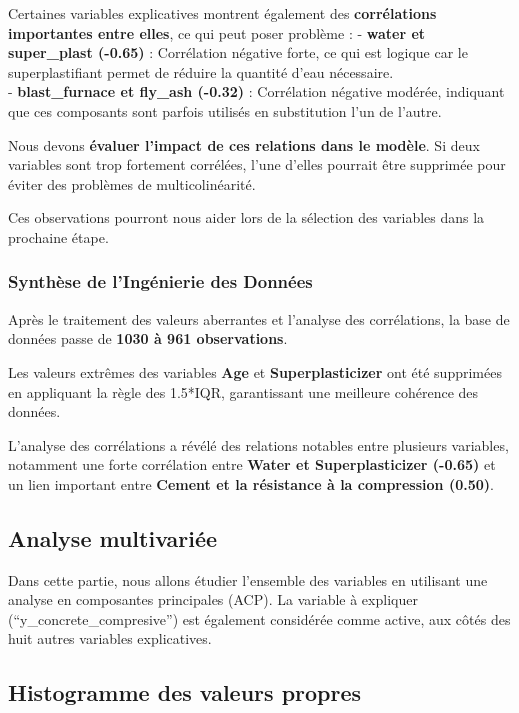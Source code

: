 \documentclass[
  12pt,
]{article}
\begin{document}
Certaines variables explicatives montrent également des
\textbf{corrélations importantes entre elles}, ce qui peut poser
problème : - \textbf{water et super\_plast (-0.65)} : Corrélation
négative forte, ce qui est logique car le superplastifiant permet de
réduire la quantité d'eau nécessaire.\\
- \textbf{blast\_furnace et fly\_ash (-0.32)} : Corrélation négative
modérée, indiquant que ces composants sont parfois utilisés en
substitution l'un de l'autre.

Nous devons \textbf{évaluer l'impact de ces relations dans le modèle}.
Si deux variables sont trop fortement corrélées, l'une d'elles pourrait
être supprimée pour éviter des problèmes de multicolinéarité.

Ces observations pourront nous aider lors de la sélection des variables
dans la prochaine étape.

\subsubsection{Synthèse de l'Ingénierie des
Données}\label{synthuxe8se-de-linguxe9nierie-des-donnuxe9es}

Après le traitement des valeurs aberrantes et l'analyse des
corrélations, la base de données passe de \textbf{1030 à 961
observations}.

Les valeurs extrêmes des variables \textbf{Age} et
\textbf{Superplasticizer} ont été supprimées en appliquant la règle des
1.5*IQR, garantissant une meilleure cohérence des données.

L'analyse des corrélations a révélé des relations notables entre
plusieurs variables, notamment une forte corrélation entre \textbf{Water
et Superplasticizer (-0.65)} et un lien important entre \textbf{Cement
et la résistance à la compression (0.50)}.

\subsection{Analyse multivariée}\label{analyse-multivariuxe9e}

Dans cette partie, nous allons étudier l'ensemble des variables en
utilisant une analyse en composantes principales (ACP). La variable à
expliquer (``y\_concrete\_compresive'') est également considérée comme
active, aux côtés des huit autres variables explicatives.

\subsection{Histogramme des valeurs
propres}\label{histogramme-des-valeurs-propres}
\end{document}
